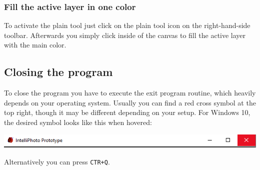 \documentclass[a4paper, 12pt]{article}
\begin{document}
\subsubsection{Fill the active layer in one color}
To activate the plain tool just click on the plain tool icon on the right-hand-side toolbar.
Afterwards you simply click inside of the canvas to fill the active layer with the main color.

\subsection{Closing the program}
To close the program you have to execute the exit program routine, which heavily depends on your operating system. Usually you can find a red cross symbol at the top right, though it may be different depending on your setup.
For Windows 10, the desired symbol looks like this when hovered:
\begin{center}
\includegraphics[width=0.9\linewidth,keepaspectratio]{assets/close-window}
\end{center}
Alternatively you can press \texttt{CTR+Q}.
\end{document}
